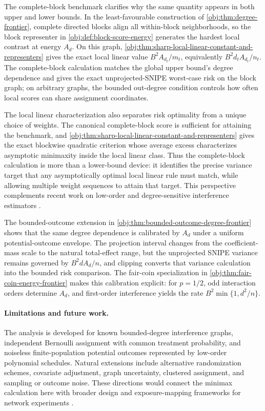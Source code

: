 The complete-block benchmark clarifies why the same quantity appears in both upper and lower bounds. In the least-favourable construction of \cref{obj:thm:degree-frontier}, complete directed blocks align all within-block neighborhoods, so the block representer in \cref{obj:def:block-score-energy} generates the hardest local contrast at energy \(A_d\). On this graph, \cref{obj:thm:sharp-local-linear-constant-and-representers} gives the exact local linear value \(B^2A_{d_t}/m_t\), equivalently \(B^2d_tA_{d_t}/n_t\). The complete-block calculation matches the global upper bound's degree dependence and gives the exact unprojected-SNIPE worst-case risk on the block graph; on arbitrary graphs, the bounded out-degree condition controls how often local scores can share assignment coordinates.

The local linear characterization also separates risk optimality from a unique choice of weights. The canonical complete-block score is sufficient for attaining the benchmark, and \cref{obj:thm:sharp-local-linear-constant-and-representers} gives the exact blockwise quadratic criterion whose average excess characterizes asymptotic minimaxity inside the local linear class. Thus the complete-block calculation is more than a lower-bound device: it identifies the precise variance target that any asymptotically optimal local linear rule must match, while allowing multiple weight sequences to attain that target. This perspective complements recent work on low-order and degree-sensitive interference estimators \citep{WangLi2026,EichhornKhanUganderYu2026}.

The bounded-outcome extension in \cref{obj:thm:bounded-outcome-degree-frontier} shows that the same degree dependence is calibrated by \(A_d\) under a uniform potential-outcome envelope. The projection interval changes from the coefficient-mass scale to the natural total-effect range, but the unprojected SNIPE variance remains governed by \(B^2dA_d/n\), and clipping converts that variance calculation into the bounded risk comparison. The fair-coin specialization in \cref{obj:thm:fair-coin-energy-frontier} makes this calibration explicit: for \(p=1/2\), odd interaction orders determine \(A_d\), and first-order interference yields the rate \(B^2\min\{1,d^2/n\}\).

\paragraph{Limitations and future work.}
The analysis is developed for known bounded-degree interference graphs, independent Bernoulli assignment with common treatment probability, and noiseless finite-population potential outcomes represented by low-order polynomial schedules. Natural extensions include alternative randomization schemes, covariate adjustment, graph uncertainty, clustered assignment, and sampling or outcome noise. These directions would connect the minimax calculation here with broader design and exposure-mapping frameworks for network experiments \citep{Leung2022,Savje2021,Hu2022,Gao2025}.

